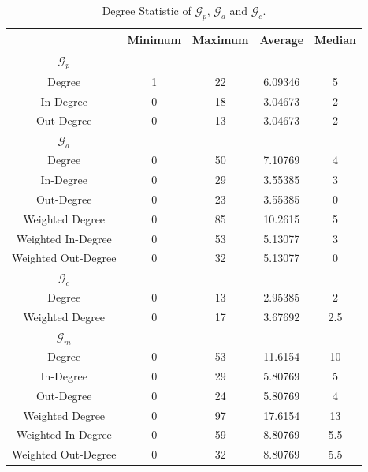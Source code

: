 \documentclass[11pt,a4paper]{book}
\theoremstyle{definition}
\theoremstyle{definition}
\theoremstyle{definition}
\theoremstyle{remark}
\newcommand{\pgraph}{\mathcal{G}_{p}}
\newcommand{\agraph}{\mathcal{G}_{a}}
\newcommand{\cgraph}{\mathcal{G}_{c}}
\newcommand{\acgraph}{\mathcal{G}_{m}}
\begin{document}
\begin{center}
\begin{table}
\small
\centering
\begin{tabular}{c| c c c c }
\toprule
{} &  Minimum &  Maximum &  Average &  Median \\
\midrule
\midrule
$\pgraph$ \\
\midrule
Degree & 1 & 22 & 6.09346 & 5 \\
In-Degree &  0 &   18 & 3.04673 & 2 \\
Out-Degree &  0 &   13 & 3.04673 & 2 \\
\midrule
$\agraph$ \\
\midrule
Degree & 0 & 50 & 7.10769 &  4 \\
In-Degree &  0 &   29 & 3.55385 & 3 \\
Out-Degree &  0 &   23 & 3.55385  &  0 \\
Weighted Degree & 0 & 85 & 10.2615 &  5 \\
Weighted In-Degree &  0 &   53 & 5.13077 & 3 \\
Weighted Out-Degree &  0 &    32 & 5.13077 &  0 \\
\midrule
$\cgraph$ \\
\midrule
 Degree & 0 & 13 & 2.95385& 2 \\
Weighted Degree & 0 & 17 & 3.67692 & 2.5 \\
\midrule
$\acgraph$ \\
\midrule
Degree & 0 & 53 & 11.6154 &  10 \\
In-Degree &  0 &   29 & 5.80769 & 5 \\
Out-Degree &  0 &   24 &  5.80769  &  4 \\
Weighted Degree & 0 & 97 & 17.6154 &  13 \\
Weighted In-Degree &  0 &   59 & 8.80769&  5.5 \\
Weighted Out-Degree &  0 &    32 & 8.80769 &   5.5 \\
\bottomrule
\end{tabular}
\caption{Degree Statistic of $\pgraph$, $\agraph$ and $\cgraph$.}
\label{tab:pgraph-degree_stat}
\end{table}
\end{center}

\clearpage
\end{document}
